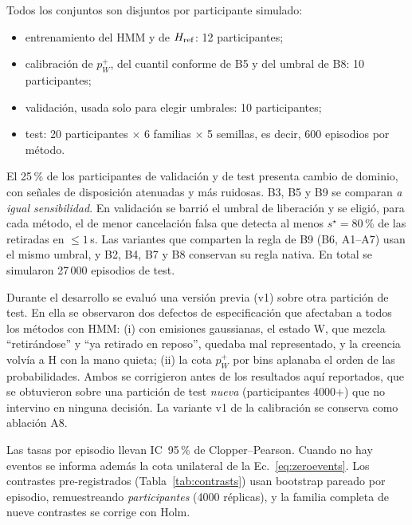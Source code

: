  Todos los conjuntos son disjuntos por participante
simulado:
\begin{itemize}
\item entrenamiento del HMM y de $H_{\rm ref}$: 12 participantes;
\item calibración de $p_W^+$, del cuantil conforme de B5 y del umbral de B8: 10 participantes;
\item validación, usada solo para elegir umbrales: 10 participantes;
\item test: 20 participantes $\times$ 6 familias $\times$ 5 semillas, es decir, 600 episodios por método.
\end{itemize}
El 25\,\% de los participantes de validación y de test presenta cambio de dominio, con señales
de disposición atenuadas y más ruidosas. B3, B5 y B9 se comparan \emph{a igual sensibilidad}. En validación se
barrió el umbral de liberación y se eligió, para cada método, el de menor cancelación falsa
que detecta al menos $s^\star=80$\,\% de las retiradas en $\le1$\,s. Las
variantes que comparten la regla de B9 (B6, A1--A7) usan el mismo umbral, y B2, B4, B7 y B8
conservan su regla nativa. En total se simularon 27\,000 episodios de test.

 Durante el desarrollo se evaluó una versión
previa (v1) sobre otra partición de test. En ella se observaron dos defectos de
especificación que afectaban a todos los métodos con HMM:
(i) con emisiones gaussianas, el estado W, que mezcla ``retirándose'' y ``ya
retirado en reposo'', quedaba mal representado, y la creencia volvía a H con la mano quieta;
(ii) la cota $p_W^+$ por bins aplanaba el orden de las probabilidades.
Ambos se corrigieron antes de los resultados aquí reportados, que se obtuvieron sobre una partición de
test \emph{nueva} (participantes 4000+) que no intervino en ninguna decisión. La
variante v1 de la calibración se conserva como ablación A8.

 Las tasas por episodio llevan IC~95\,\% de
Clopper--Pearson. Cuando no hay eventos se informa además la cota unilateral
de la Ec.~\eqref{eq:zeroevents}. Los contrastes pre-registrados (Tabla~\ref{tab:contrasts})
usan bootstrap pareado por episodio, remuestreando \emph{participantes} (4000 réplicas), y la
familia completa de nueve contrastes se corrige con Holm.

